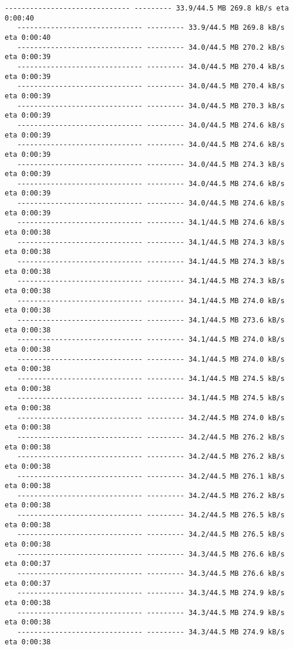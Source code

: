 \documentclass[11pt]{article}
\begin{document}
\begin{Verbatim}[commandchars=\\\{\}]
   ------------------------------ --------- 33.9/44.5 MB 269.8 kB/s eta 0:00:40
   ------------------------------ --------- 33.9/44.5 MB 269.8 kB/s eta 0:00:40
   ------------------------------ --------- 34.0/44.5 MB 270.2 kB/s eta 0:00:39
   ------------------------------ --------- 34.0/44.5 MB 270.4 kB/s eta 0:00:39
   ------------------------------ --------- 34.0/44.5 MB 270.4 kB/s eta 0:00:39
   ------------------------------ --------- 34.0/44.5 MB 270.3 kB/s eta 0:00:39
   ------------------------------ --------- 34.0/44.5 MB 274.6 kB/s eta 0:00:39
   ------------------------------ --------- 34.0/44.5 MB 274.6 kB/s eta 0:00:39
   ------------------------------ --------- 34.0/44.5 MB 274.3 kB/s eta 0:00:39
   ------------------------------ --------- 34.0/44.5 MB 274.6 kB/s eta 0:00:39
   ------------------------------ --------- 34.0/44.5 MB 274.6 kB/s eta 0:00:39
   ------------------------------ --------- 34.1/44.5 MB 274.6 kB/s eta 0:00:38
   ------------------------------ --------- 34.1/44.5 MB 274.3 kB/s eta 0:00:38
   ------------------------------ --------- 34.1/44.5 MB 274.3 kB/s eta 0:00:38
   ------------------------------ --------- 34.1/44.5 MB 274.3 kB/s eta 0:00:38
   ------------------------------ --------- 34.1/44.5 MB 274.0 kB/s eta 0:00:38
   ------------------------------ --------- 34.1/44.5 MB 273.6 kB/s eta 0:00:38
   ------------------------------ --------- 34.1/44.5 MB 274.0 kB/s eta 0:00:38
   ------------------------------ --------- 34.1/44.5 MB 274.0 kB/s eta 0:00:38
   ------------------------------ --------- 34.1/44.5 MB 274.5 kB/s eta 0:00:38
   ------------------------------ --------- 34.1/44.5 MB 274.5 kB/s eta 0:00:38
   ------------------------------ --------- 34.2/44.5 MB 274.0 kB/s eta 0:00:38
   ------------------------------ --------- 34.2/44.5 MB 276.2 kB/s eta 0:00:38
   ------------------------------ --------- 34.2/44.5 MB 276.2 kB/s eta 0:00:38
   ------------------------------ --------- 34.2/44.5 MB 276.1 kB/s eta 0:00:38
   ------------------------------ --------- 34.2/44.5 MB 276.2 kB/s eta 0:00:38
   ------------------------------ --------- 34.2/44.5 MB 276.5 kB/s eta 0:00:38
   ------------------------------ --------- 34.2/44.5 MB 276.5 kB/s eta 0:00:38
   ------------------------------ --------- 34.3/44.5 MB 276.6 kB/s eta 0:00:37
   ------------------------------ --------- 34.3/44.5 MB 276.6 kB/s eta 0:00:37
   ------------------------------ --------- 34.3/44.5 MB 274.9 kB/s eta 0:00:38
   ------------------------------ --------- 34.3/44.5 MB 274.9 kB/s eta 0:00:38
   ------------------------------ --------- 34.3/44.5 MB 274.9 kB/s eta 0:00:38

\end{Verbatim}
\end{document}
